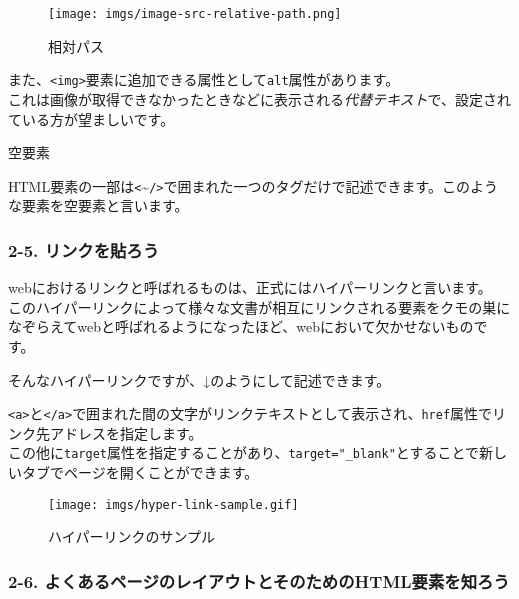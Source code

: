 \begin{figure}
\centering
\texttt{[image: imgs/image-src-relative-path.png]}
\caption{相対パス}
\end{figure}

また、\texttt{\textless{}img\textgreater{}}要素に追加できる属性として\texttt{alt}属性があります。\\
これは画像が取得できなかったときなどに表示される\emph{代替テキスト}で、設定されている方が望ましいです。

空要素

HTML要素の一部は\texttt{\textless{}}\textasciitilde{}\texttt{/\textgreater{}}で囲まれた一つのタグだけで記述できます。このような要素を空要素と言います。

\subsubsection{2-5.
リンクを貼ろう}\label{ux30eaux30f3ux30afux3092ux8cbcux308dux3046}

webにおけるリンクと呼ばれるものは、正式にはハイパーリンクと言います。\\
このハイパーリンクによって様々な文書が相互にリンクされる要素をクモの巣になぞらえてwebと呼ばれるようになったほど、webにおいて欠かせないものです。

そんなハイパーリンクですが、↓のようにして記述できます。

\begin{Shaded}
\begin{Highlighting}[]
\DataTypeTok{\textless{}}\OperatorTok{=}\DataTypeTok{\textgreater{}}\DataTypeTok{\textless{}/}\DataTypeTok{\textgreater{}}
\end{Highlighting}
\end{Shaded}

\texttt{\textless{}a\textgreater{}}と\texttt{\textless{}/a\textgreater{}}で囲まれた間の文字がリンクテキストとして表示され、\texttt{href}属性でリンク先アドレスを指定します。\\
この他に\texttt{target}属性を指定することがあり、\texttt{target="\_blank"}とすることで新しいタブでページを開くことができます。

\begin{figure}
\centering
\texttt{[image: imgs/hyper-link-sample.gif]}
\caption{ハイパーリンクのサンプル}
\end{figure}

\subsubsection{2-6.
よくあるページのレイアウトとそのためのHTML要素を知ろう}\label{ux3088ux304fux3042ux308bux30daux30fcux30b8ux306eux30ecux30a4ux30a2ux30a6ux30c8ux3068ux305dux306eux305fux3081ux306ehtmlux8981ux7d20ux3092ux77e5ux308dux3046}

